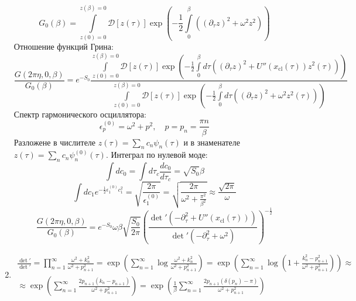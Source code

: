 \documentclass[12pt]{article}
\theoremstyle{definition}
\begin{document}
\begin{enumerate}
\begin{equation}
        G_0(\beta)=\int\limits_{z(0)=0}^{z(\beta)=0}\mathcal{D}[z(\tau)]\exp\left(-\frac{1}{2}\int\limits_0^\beta((\partial_\tau z)^2+\omega^2z^2)\right)
    \end{equation}
    Отношение функций Грина:
    \begin{equation}
        \frac{G(2\pi\eta,0,\beta)}{G_0(\beta)}=e^{-S_0}\frac{\int\limits_{z(0)=0}^{z(\beta)=0}\mathcal{D}[z(\tau)]\exp\left(-\frac{1}{2}\int\limits_0^\beta d\tau((\partial_\tau z)^2+U''(x_\text{cl}(\tau))z^2(\tau))\right)}{\int\limits_{z(0)=0}^{z(\beta)=0}\mathcal{D}[z(\tau)]\exp\left(-\frac{1}{2}\int\limits_0^\beta d\tau((\partial_\tau z)^2+\omega^2z^2(\tau))\right)}
    \end{equation}
    Спектр гармонического осциллятора:
    \begin{equation}
        \epsilon_p^{(0)}=\omega^2+p^2,\quad p=p_n=\frac{\pi n}{\beta}
    \end{equation}
    Разложене в числителе $z(\tau)=\sum\limits_{n}c_n\psi_n(\tau)$ и в знаменателе $z(\tau)=\sum\limits_nc_n\psi^{(0)}_n(\tau)$.
    Интеграл по нулевой моде:
    \begin{equation}
        \int dc_0=\int d\tau_c\frac{dc_0}{d\tau_c}=\sqrt{S_0}\beta
    \end{equation}
    \begin{equation}
        \int dc_1e^{-\frac{1}{2}\epsilon^{(0)}_1c^2_1}=\sqrt{\frac{2\pi}{\epsilon^{(0)}_1}}=\sqrt{\frac{2\pi}{\omega^2+\frac{\pi^2}{\beta^2}}}\approx\frac{\sqrt{2\pi}}{\omega}
    \end{equation}
    \begin{equation}
        \boxed{\frac{G(2\pi\eta,0,\beta)}{G_0(\beta)}=e^{-S_0}\omega\beta\sqrt{\frac{S_0}{2\pi}}\left(\frac{\det'(-\partial^2_\tau+U''(x_\text{cl}(\tau)))}{\det'(-\partial^2_\tau+\omega^2)}\right)^{-\frac{1}{2}}}
    \end{equation}
    \item
    \begin{multline}
        \frac{\det'}{\det'}=\prod\limits_{n=1}^\infty\frac{\omega^2+k_n^2}{\omega^2+p^2_{n+1}}=\exp\left(\sum\limits_{n=1}^\infty\log\frac{\omega^2+k_n^2}{\omega^2+p^2_{n+1}}\right)=\exp\left(\sum\limits_{n=1}^\infty\log\left(1+\frac{k_n^2-p_{n+1}^2}{\omega^2+p^2_{n+1}}\right)\right)\approx\\\approx\exp\left(\sum\limits_{n=1}^\infty\frac{2p_{n+1}(k_n-p_{n+1})}{\omega^2+p^2_{n+1}}\right)=\exp\left(\frac{1}{\beta}\sum\limits_{n=1}^\infty\frac{2p_{n+1}(\delta(p_n)-\pi)}{\omega^2+p^2_{n+1}}\right)
    \end{multline}

\end{enumerate}
\end{document}
